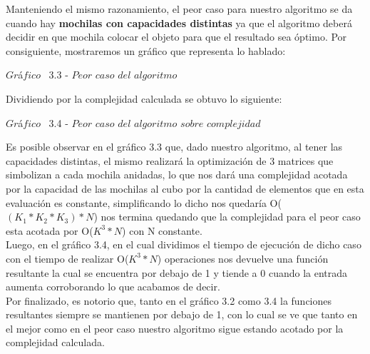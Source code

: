 Manteniendo el mismo razonamiento, el peor caso para nuestro algoritmo se da cuando hay \textbf{mochilas con capacidades distintas} ya que el algoritmo deber\'a decidir en que mochila colocar el objeto para que el resultado sea \'optimo. Por consiguiente, mostraremos un gr\'afico que representa lo hablado:\\

\vspace*{0.3cm} \vspace*{0.3cm}
  \begin{center}
 {$Gr$\'a$fico$ \ 3.3 - $Peor$ $caso$ $del$ $algoritmo$}
  \end{center}
  \vspace*{0.3cm}

Dividiendo por la complejidad calculada se obtuvo lo siguiente:\\

\vspace*{0.3cm} \vspace*{0.3cm}
  \begin{center}
 {$Gr$\'a$fico$ \ 3.4 - $Peor$ $caso$ $del$ $algoritmo$ $sobre$ $complejidad$}
  \end{center}
  \vspace*{0.3cm}
  
  
Es posible observar en el gr\'afico 3.3 que, dado nuestro algoritmo, al tener las capacidades distintas, el mismo realizar\'a la optimizaci\'on de 3 matrices que simbolizan a cada mochila anidadas, lo que nos dar\'a una complejidad acotada por la capacidad de las mochilas al cubo por la cantidad de elementos que en esta evaluaci\'on es constante, simplificando lo dicho nos quedar\'ia O($(K_{1}\ast K_{2} \ast K_{3}) \ast N$) nos termina quedando que la complejidad para el peor caso esta acotada por O($K^{3} \ast N$) con N constante.\\
Luego, en el gr\'afico 3.4, en el cual dividimos el tiempo de ejecuci\'on de dicho caso con el tiempo de realizar O($K^{3} \ast N$) operaciones nos devuelve una funci\'on resultante la cual se encuentra por debajo de 1 y tiende a 0 cuando la entrada aumenta corroborando lo que acabamos de decir.\\

Por finalizado, es notorio que, tanto en el gr\'afico 3.2 como 3.4 la funciones resultantes siempre se mantienen por debajo de 1, con lo cual se ve que tanto en el mejor como en el peor caso nuestro algoritmo sigue estando acotado por la complejidad calculada.\\

